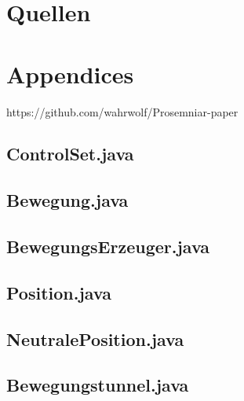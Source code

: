 \documentclass[11pt,a4paper,oneside]{article}
\begin{document}
\section{Quellen}
{}


\section{Appendices}
 https://github.com/wahrwolf/Prosemniar-paper
\subsection*{ControlSet.java}

\subsection*{Bewegung.java}
\subsection*{BewegungsErzeuger.java}
\subsection*{Position.java}
\subsection*{NeutralePosition.java}
\subsection*{Bewegungstunnel.java}
\end{document}
